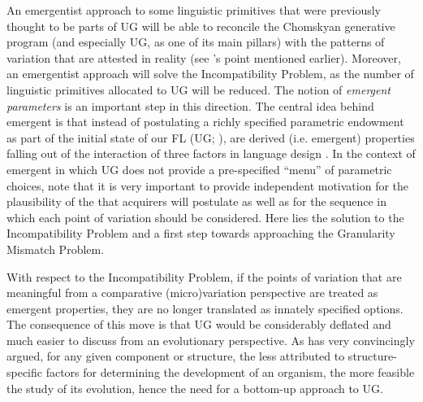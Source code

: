 \documentclass[output=paper]{langsci/langscibook}
\begin{document}
An emergentist approach to some linguistic primitives that were previously
thought to be parts of \gls{UG} will be able to reconcile
the Chomskyan generative program (and especially \gls{UG}, as one of its main
pillars) with the patterns of variation that are attested in reality (see
\citeauthor{Yang2004}’s \citeyear{Yang2004} point mentioned earlier). Moreover,
an emergentist approach will solve the Incompatibility Problem, as the number
of linguistic primitives allocated to \gls{UG} will be reduced. The notion of
\emph{emergent parameters}
\parencite{RobHol2010,Roberts2012,BibRobShee2014,BibRob2017} is an important
step in this direction. The central idea behind emergent  is
that instead of postulating a richly specified parametric endowment as part of
the initial state of our \gls{FL} (UG; \citealt{Chomsky1981}), 
are derived (i.e. emergent) properties falling out of the interaction of
 three factors in language design
\citep{BibHolRobShee2014}. In the context of emergent  in which
\gls{UG} does not provide a pre-specified \enquote{menu} of parametric choices,
\citet{BibRobShee2014} note that it is very important to provide independent
motivation for the plausibility of the  that acquirers will
postulate as well as for the sequence in which each point of variation should
be considered. Here lies the solution to the Incompatibility Problem and a
first step towards approaching the Granularity Mismatch Problem.

With respect to the Incompatibility Problem, if the points of variation that
are meaningful from a comparative (micro)variation perspective are treated as
emergent properties, they are no longer translated as innately specified
options. The consequence of this move is that \gls{UG} would be considerably
deflated and much easier to discuss from an evolutionary perspective. As
\citet{Chomsky2007} has very convincingly argued, for any given component or
structure, the less attributed to structure-specific factors for determining
the development of an organism, the more feasible the study of its evolution,
hence the need for a bottom-up approach to \gls{UG}.
\end{document}
